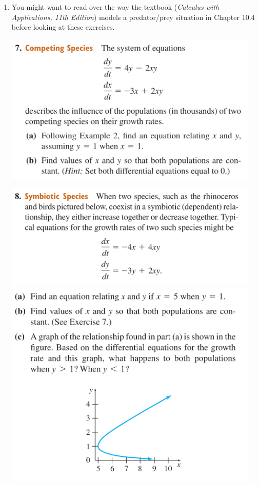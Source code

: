 \begin{enumerate}
    \item %
        You might want to read over the way the textbook 
        (\emph{Calculus with Applications, 11th Edition}) 
        models a predator/prey situation
        in Chapter 10.4 before looking at these exercises.
        \begin{center}
            \includegraphics[width=0.96\textwidth]{screenshots/7.png}
        \end{center}
        \newpage
        \begin{center}
            \includegraphics[width=0.96\textwidth]{screenshots/8-1.png}
            \includegraphics[width=0.96\textwidth]{screenshots/8-2.png}
        \end{center}


\end{enumerate}
